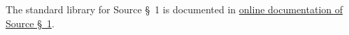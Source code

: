 









\newpage



















The standard library for Source \S\ 1 is documented in
\href{}{online documentation of Source \S\ 1}.




    
